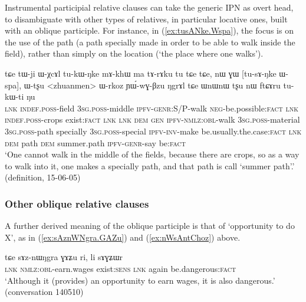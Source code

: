 Instrumental participial relative clauses can take the generic IPN  as overt head, to disambiguate with other types of relatives, in particular locative ones, built with an oblique participle. For instance, in (\ref{ex:tusANke.Wspa}), the focus is on the use of the path (a path specially made in order to be able to walk inside the field), rather than simply on the location (`the place where one walks').

\begin{exe}
\ex \label{ex:tusANke.Wspa}
\gll tɕe tɯ-ji ɯ-χcɤl tu-kɯ-ŋke mɤ-khɯ ma tɤ-rɤku tu tɕe tɕe, nɯ ɣɯ [tu-sɤ-ŋke ɯ-spa], ɯ-tʂu <zhuanmen> ɯ-rkoz ɲɯ́-wɣ-βzu ŋgrɤl tɕe ɯnɯnɯ tʂu nɯ ftɕɤru tu-kɯ-ti ŋu \\
\textsc{lnk} \textsc{indef}.\textsc{poss}-field \textsc{3sg}.\textsc{poss}-middle \textsc{ipfv}-\textsc{genr}:S/P-walk \textsc{neg}-be.possible:\textsc{fact} \textsc{lnk} \textsc{indef}.\textsc{poss}-crops exist:\textsc{fact} \textsc{lnk} \textsc{lnk} \textsc{dem} \textsc{gen} \textsc{ipfv}-\textsc{nmlz}:\textsc{obl}-walk \textsc{3sg}.\textsc{poss}-material \textsc{3sg}.\textsc{poss}-path specially \textsc{3sg}.\textsc{poss}-special \textsc{ipfv}-\textsc{inv}-make be.usually.the.case:\textsc{fact} \textsc{lnk} \textsc{dem} path \textsc{dem} summer.path \textsc{ipfv}-\textsc{genr}-say be:\textsc{fact} \\
\glt `One cannot walk in the middle of the fields, because there are crops, so as a way to walk into it, one makes a specially path, and that path is call `summer path'.' (definition, 15-06-05)
\end{exe} 

\subsubsection{Other oblique relative clauses} \label{sec:other.oblique.participle.relatives}


A further derived meaning of the oblique participle is that of `opportunity to do X', as in (\ref{ex:sAznWNgra.GAZu}) and (\ref{ex:nWsAntChoz}) above.

\begin{exe}
\ex \label{ex:sAznWNgra.GAZu}
\gll tɕe sɤz-nɯŋgra ɣɤʑu ri, li sɤɣʑɯr \\
\textsc{lnk} \textsc{nmlz}:\textsc{obl}-earn.wages exist:\textsc{sens} \textsc{lnk} again be.dangerous:\textsc{fact} \\
\glt `Although it (provides) an opportunity to earn wages, it is also dangerous.' (conversation 140510)
\end{exe}

